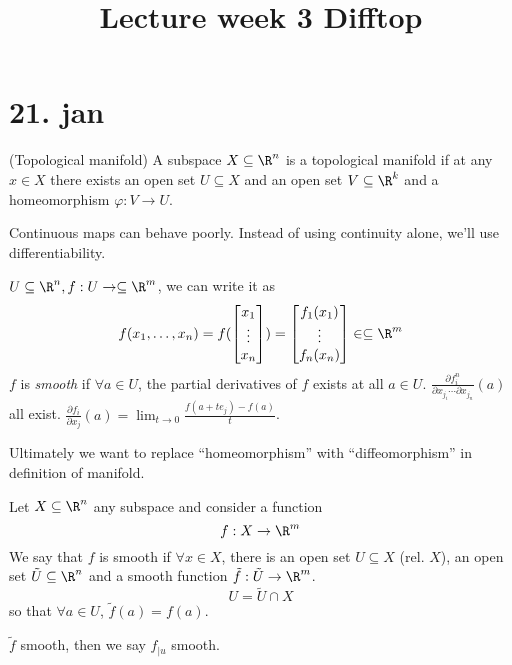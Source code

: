 \title{Lecture week 3 Difftop}
\maketitle
\section{21. jan}
\begin{definition}
  (Topological manifold)
  \newline
  A subspace $X\subseteq \R^n$ is a topological manifold if at any $x\in X$ there exists an open set $U\subseteq X$ and an open set $V \subseteq \R^k$ and a homeomorphism $\varphi:V\to U$.
\end{definition}

Continuous maps can behave poorly. Instead of using continuity alone, we'll use differentiability.
\begin{definition}
  $U \subseteq \R^n ,f: U \to \subseteq \R^m $, we can write it as
    $$f(x_1,\dots,x_n)=f(
    \begin{bmatrix}
        x_1 \\
        \vdots \\
        x_n
    \end{bmatrix}
    )=
    \begin{bmatrix}
        f_1(x_1) \\
        \vdots \\
        f_n(x_n)
    \end{bmatrix}\in \subseteq \R^m$$
  $f$ is \emph{smooth} if $\forall a\in U$, the partial derivatives of $f$ exists at all $a\in U$.
    \newline
  $\frac{\partial f_i^n}{\partial x_{j_i}\cdots \partial x_{j_n}}(a)$ all exist.
  \newline
  $\frac{\partial f_i}{\partial x_j}(a)=\lim_{t\to 0}\frac{f(a+te_j)-f(a)}{t}$.
\end{definition}
Ultimately we want to replace ``homeomorphism'' with ``diffeomorphism'' in definition of manifold.
\begin{definition}
  Let $X \subseteq \R^n $ any subspace and consider a function
    $$f:X\to \R^m$$
  We say that $f$ is smooth if $\forall x\in X$, there is an open set $U \subseteq X$ (rel. $X$), an open set $\tilde{U} \subseteq \R^n $ and a smooth function $\tilde{f}:\tilde{U}\to \R^m$.
  $$U=\tilde{U}\cap X$$
  so that $\forall a\in U$, $\tilde{f}(a)=f(a)$.

$\tilde{f}$ smooth, then we say $f_{\rvert u}$ smooth.
\end{definition}
